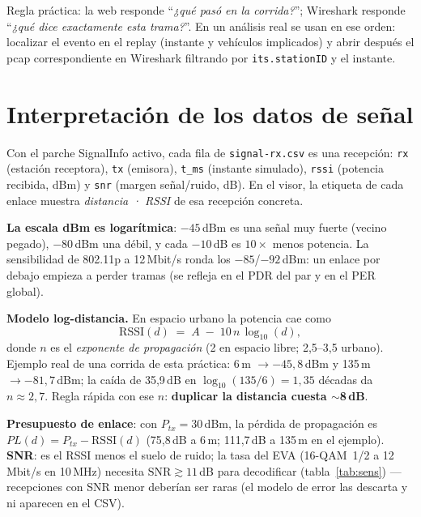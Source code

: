\documentclass[11pt,a4paper]{article}
\begin{document}
\begin{notabox}
Regla práctica: la web responde ``\emph{¿qué pasó en la corrida?}'';
Wireshark responde ``\emph{¿qué dice exactamente esta trama?}''. En un
análisis real se usan en ese orden: localizar el evento en el replay
(instante y vehículos implicados) y abrir después el pcap correspondiente en
Wireshark filtrando por \texttt{its.stationID} y el instante.
\end{notabox}

\section{Interpretación de los datos de señal}

Con el parche SignalInfo activo, cada fila de \texttt{signal-rx.csv} es una
recepción: \texttt{rx} (estación receptora), \texttt{tx} (emisora),
\texttt{t\_ms} (instante simulado), \texttt{rssi} (potencia recibida, dBm) y
\texttt{snr} (margen señal/ruido, dB). En el visor, la etiqueta de cada
enlace muestra \emph{distancia · RSSI} de esa recepción concreta.

\textbf{La escala dBm es logarítmica}: $-45$\,dBm es una señal muy fuerte
(vecino pegado), $-80$\,dBm una débil, y cada $-10$\,dB es $10\times$ menos
potencia. La sensibilidad de 802.11p a 12\,Mbit/s ronda los $-85$/$-92$\,dBm:
un enlace por debajo empieza a perder tramas (se refleja en el PDR del par y
en el PER global).

\textbf{Modelo log-distancia.} En espacio urbano la potencia cae como
\[ \mathrm{RSSI}(d) \;=\; A \;-\; 10\,n\,\log_{10}(d), \]
donde $n$ es el \emph{exponente de propagación} (2 en espacio libre;
2,5--3,5 urbano). Ejemplo real de una corrida de esta práctica: 6\,m
$\rightarrow -45{,}8$\,dBm y 135\,m $\rightarrow -81{,}7$\,dBm; la caída de
35,9\,dB en $\log_{10}(135/6)=1{,}35$ décadas da $n \approx 2{,}7$. Regla
rápida con ese $n$: \textbf{duplicar la distancia cuesta $\sim$8\,dB}.

\textbf{Presupuesto de enlace}: con $P_{tx}=30$\,dBm, la pérdida de
propagación es $PL(d) = P_{tx} - \mathrm{RSSI}(d)$ (75,8\,dB a 6\,m;
111,7\,dB a 135\,m en el ejemplo). \textbf{SNR}: es el RSSI menos el suelo de
ruido; la tasa del EVA (16-QAM~1/2 a 12\,Mbit/s en 10\,MHz) necesita
$\mathrm{SNR}\gtrsim 11$\,dB para decodificar (tabla~\ref{tab:sens}) ---
recepciones con SNR menor deberían ser raras (el modelo de error las descarta
y ni aparecen en el CSV).
\end{document}
